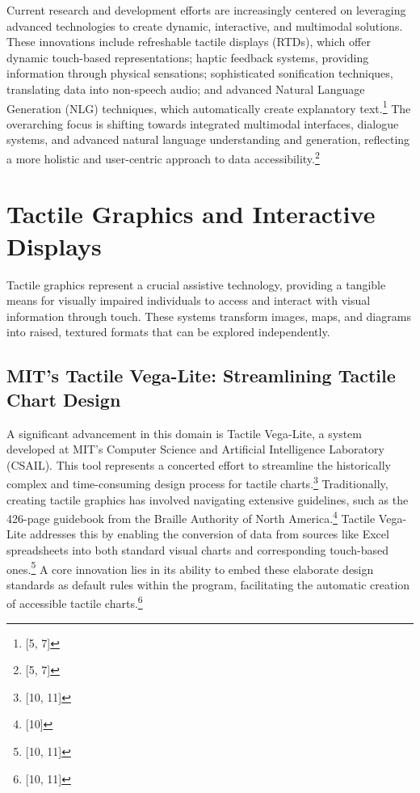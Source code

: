 Current research and development efforts are increasingly centered on leveraging advanced technologies to create dynamic, interactive, and multimodal solutions. These innovations include refreshable tactile displays (RTDs), which offer dynamic touch-based representations; haptic feedback systems, providing information through physical sensations; sophisticated sonification techniques, translating data into non-speech audio; and advanced Natural Language Generation (NLG) techniques, which automatically create explanatory text.\footnote{[5, 7]} The overarching focus is shifting towards integrated multimodal interfaces, dialogue systems, and advanced natural language understanding and generation, reflecting a more holistic and user-centric approach to data accessibility.\footnote{[5, 7]}

\section{Tactile Graphics and Interactive Displays}
Tactile graphics represent a crucial assistive technology, providing a tangible means for visually impaired individuals to access and interact with visual information through touch. These systems transform images, maps, and diagrams into raised, textured formats that can be explored independently.~ \cite{TactileGraphicsAndInteractiveDisplays}

\subsection{MIT's Tactile Vega-Lite: Streamlining Tactile Chart Design}

A significant advancement in this domain is Tactile Vega-Lite, a system developed at MIT's Computer Science and Artificial Intelligence Laboratory (CSAIL). This tool represents a concerted effort to streamline the historically complex and time-consuming design process for tactile charts.\footnote{[10, 11]} Traditionally, creating tactile graphics has involved navigating extensive guidelines, such as the 426-page guidebook from the Braille Authority of North America.\footnote{[10]} Tactile Vega-Lite addresses this by enabling the conversion of data from sources like Excel spreadsheets into both standard visual charts and corresponding touch-based ones.\footnote{[10, 11]} A core innovation lies in its ability to embed these elaborate design standards as default rules within the program, facilitating the automatic creation of accessible tactile charts.\footnote{[10, 11]}

